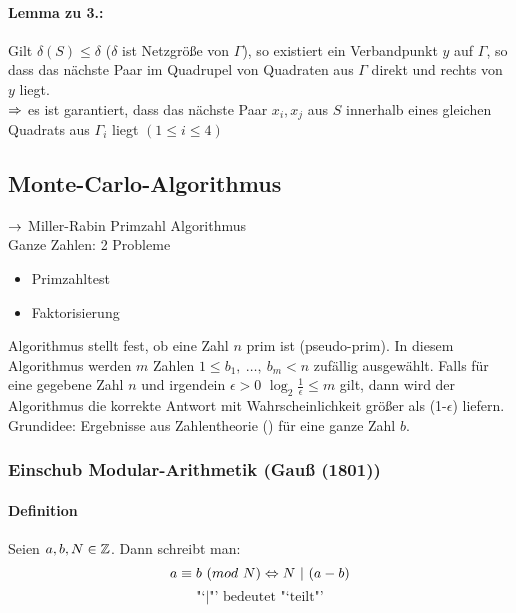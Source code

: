 \documentclass[a4paper,twoside,DIV15,BCOR12mm]{scrbook}
\begin{document}
\paragraph{Lemma zu 3.:} Gilt $\delta(S) \leq \delta$ ($\delta$ ist Netzgröße von $\Gamma$), so existiert ein Verbandpunkt $y$ auf $\Gamma$, so dass das nächste Paar im Quadrupel von Quadraten aus $\Gamma$ direkt und rechts von $y$ liegt. \\
$\Rightarrow$ es ist garantiert, dass das nächste Paar $x_i, x_j$ aus $S$ innerhalb eines gleichen Quadrats aus $\Gamma_i$ liegt 
$(1\leq i \leq 4)$

\subsection{Monte-Carlo-Algorithmus}
$\rightarrow$ Miller-Rabin Primzahl Algorithmus \\
Ganze Zahlen: 2 Probleme
\begin{itemize}
	\item Primzahltest
	\item Faktorisierung
\end{itemize}

Algorithmus stellt fest, ob eine Zahl $n$ prim ist (pseudo-prim). In diesem Algorithmus werden $m$ Zahlen $1\leq b_1,\ \ldots,\ b_m<n$ zufällig ausgewählt. Falls für eine gegebene Zahl $n$ und irgendein $\epsilon>0$ $\log_2\frac{1}{\epsilon}\leq m$ gilt, dann wird der Algorithmus die korrekte Antwort mit Wahrscheinlichkeit größer als (1-$\epsilon$) liefern.\\
Grundidee: Ergebnisse aus Zahlentheorie () für eine ganze Zahl $b$.\\



\def\ggT{\text{ ggT}}

\subsubsection{Einschub Modular-Arithmetik (Gauß (1801))}
\paragraph{Definition}
Seien $a,b,N\in \mathbb{Z}$. Dann schreibt man:
$$a \equiv b\ (mod\ N) \Gdw N\ |\ (a-b)$$
$$\text{"`$|$"' bedeutet "`teilt"'}$$
\end{document}
